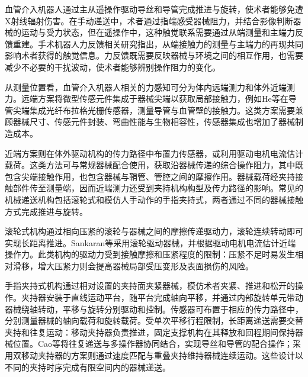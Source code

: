 \documentclass{JQR_LaTeX_Template-0507/JQRnew}
\begin{document}
\maketitle

\makeatletter
{}
\makeatother
血管介入机器人通过主从遥操作驱动导丝和导管完成推进与旋转，使术者能够免遭X射线辐射伤害。在手动递送中，术者通过指端感受器械阻力，并结合影像判断器械的运动与受力状态，但在遥操作中，这种触觉联系需要通过从端测量和主端力反馈重建。手术机器人力反馈相关研究指出，从端接触力的测量与主端力的再现共同影响术者获得的触觉信息。力反馈既需要反映器械与环境之间的相互作用，也需要减少不必要的干扰波动，使术者能够辨别操作阻力的变化。

从测量位置看，血管介入机器人相关的力感知可分为体内远端测力和体外近端测力。远端方案将微型传感元件集成于器械尖端以获取局部接触力，例如He等在导管尖端集成光纤布拉格光栅传感器，测量导管与血管壁的接触力。这类方案需要兼顾器械尺寸、传感元件封装、弯曲性能与生物相容性，传感器集成也增加了器械制造成本。

近端方案则在体外驱动机构的传力路径中布置力传感器，或利用驱动电机电流估计载荷。这类方法可与常规器械配合使用，获取沿器械传递的综合操作阻力，其中既包含尖端接触作用，也包含器械与鞘管、管腔之间的摩擦作用。器械载荷经夹持接触部件传至测量端，因而近端测力还受到夹持机构构型及传力路径的影响。常见的机械递送机构包括滚轮式和模仿人手动作的手指夹持式，两者通过不同的器械接触方式完成推进与旋转。

滚轮式机构通过相向压紧的滚轮与器械之间的摩擦传递驱动力，滚轮连续转动即可实现长距离推进。Sankaran等采用滚轮驱动器械，并根据驱动电机电流估计近端操作力。此类机构的驱动力受到接触摩擦和压紧程度的限制：压紧不足时易发生相对滑移，增大压紧力则会提高器械局部受压变形及表面损伤的风险。

手指夹持式机构通过相对设置的夹持面夹紧器械，模仿术者夹紧、推进和松开的操作。夹持器安装于直线运动平台，随平台完成轴向平移，并通过内部旋转单元带动器械绕轴转动，平移与旋转分别驱动和控制。传感器可布置于相应的传力路径中，分别测量器械的轴向载荷和旋转载荷。受单次平移行程限制，长距离递送需要交替夹持和往复运动：移动夹持器负责推进，固定支撑机构在其释放和回程期间保持器械位置。Cao等将往复递送与多操作器协同结合，实现导丝和导管的配合操作；采用双移动夹持器的方案则通过速度匹配与重叠夹持维持器械连续运动。这些设计以不同的夹持时序完成有限空间内的器械递送。
\end{document}
